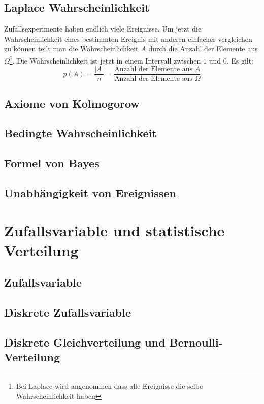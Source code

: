 \documentclass[a4paper]{scrartcl}
\begin{document}
        \subsection{Laplace Wahrscheinlichkeit}
            Zufallsexperimente haben endlich viele Ereignisse. Um jetzt die Wahrscheinlichkeit eines bestimmten Ereignis mit anderen einfacher vergleichen zu können
            teilt man die Wahrscheinlichkeit \(A\) durch die Anzahl der Elemente aus \(\Omega\)\footnote{Bei Laplace wird angenommen dass alle Ereignisse die selbe Wahrscheinlichkeit haben}.
            Die Wahrscheinlichkeit ist jetzt in einem Intervall zwischen \(1\) und \(0\). Es gilt:
            \begin{equation}
                p(A) = \frac{|A|}{n} = \frac{\text{Anzahl der Elemente aus }A}{\text{Anzahl der Elemente aus } \Omega}
            \end{equation}
        \subsection{Axiome von Kolmogorow}
        \subsection{Bedingte Wahrscheinlichkeit}
        \subsection{Formel von Bayes}
        \subsection{Unabhängigkeit von Ereignissen}
    \section{Zufallsvariable und statistische Verteilung}
        \subsection{Zufallsvariable}
            
        \subsection{Diskrete Zufallsvariable}
        \subsection{Diskrete Gleichverteilung und Bernoulli-Verteilung}
\end{document}
